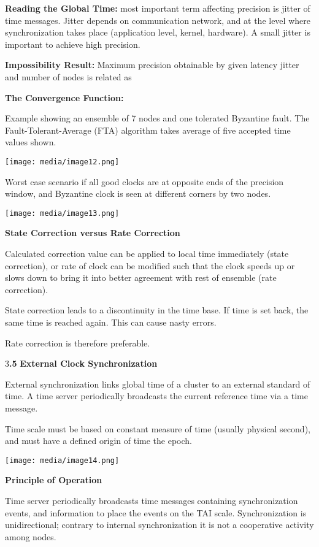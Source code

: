 \textbf{Reading the Global Time:} most important term affecting
precision is jitter of time messages. Jitter depends on communication
network, and at the level where synchronization takes place (application
level, kernel, hardware). A small jitter is important to achieve high
precision.

\textbf{Impossibility Result:} Maximum precision obtainable by given
latency jitter and number of nodes is related as

\textbf{The Convergence Function:}

Example showing an ensemble of 7 nodes and one tolerated Byzantine
fault. The Fault-Tolerant-Average (FTA) algorithm takes average of five
accepted time values shown.

\texttt{[image: media/image12.png]}

Worst case scenario if all good clocks are at opposite ends of the
precision window, and Byzantine clock is seen at different corners by
two nodes.

\texttt{[image: media/image13.png]}

\textbf{State Correction versus Rate Correction}

Calculated correction value can be applied to local time immediately
(state correction), or rate of clock can be modified such that the clock
speeds up or slows down to bring it into better agreement with rest of
ensemble (rate correction).

State correction leads to a discontinuity in the time base. If time is
set back, the same time is reached again. This can cause nasty errors.

Rate correction is therefore preferable.

3\textbf{.5} \protect\hypertarget{teil6}{}{}\textbf{External Clock
Synchronization}

External synchronization links global time of a cluster to an external
standard of time. A time server periodically broadcasts the current
reference time via a time message.

Time scale must be based on constant measure of time (usually physical
second), and must have a defined origin of time the epoch.

\texttt{[image: media/image14.png]}

\textbf{Principle of Operation}

Time server periodically broadcasts time messages containing
synchronization events, and information to place the events on the TAI
scale. Synchronization is unidirectional; contrary to internal
synchronization it is not a cooperative activity among nodes.

